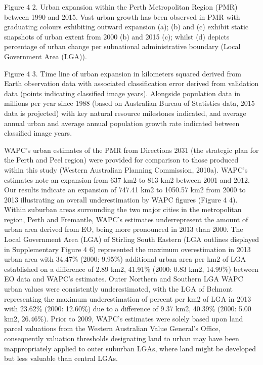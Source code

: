 \documentclass[]{book}
\begin{document}
Figure 4 2. Urban expansion within the Perth Metropolitan Region (PMR)
between 1990 and 2015. Vast urban growth has been observed in PMR with
graduating colours exhibiting outward expansion (a); (b) and (c) exhibit
static snapshots of urban extent from 2000 (b) and 2015 (c); whilst (d)
depicts percentage of urban change per subnational administrative
boundary (Local Government Area (LGA)).

Figure 4 3. Time line of urban expansion in kilometers squared derived
from Earth observation data with associated classification error derived
from validation data (points indicating classified image years).
Alongside population data in millions per year since 1988 (based on
Australian Bureau of Statistics data, 2015 data is projected) with key
natural resource milestones indicated, and average annual urban and
average annual population growth rate indicated between classified image
years.

WAPC's urban estimates of the PMR from Directions 2031 (the strategic
plan for the Perth and Peel region) were provided for comparison to
those produced within this study (Western Australian Planning
Commission, 2010a). WAPC's estimates note an expansion from 637 km2 to
813 km2 between 2001 and 2012. Our results indicate an expansion of
747.41 km2 to 1050.57 km2 from 2000 to 2013 illustrating an overall
underestimation by WAPC figures (Figure 4 4). Within suburban areas
surrounding the two major cities in the metropolitan region, Perth and
Fremantle, WAPC's estimates underrepresent the amount of urban area
derived from EO, being more pronounced in 2013 than 2000. The Local
Government Area (LGA) of Stirling South Eastern (LGA outlines displayed
in Supplementary Figure 4 6) represented the maximum overestimation in
2013 urban area with 34.47\% (2000: 9.95\%) additional urban area per
km2 of LGA established on a difference of 2.89 km2, 41.91\% (2000: 0.83
km2, 14.99\%) between EO data and WAPC's estimates. Outer Northern and
Southern LGA WAPC urban values were consistently underestimated, with
the LGA of Belmont representing the maximum underestimation of percent
per km2 of LGA in 2013 with 23.62\% (2000: 12.60\%) due to a difference
of 9.37 km2, 40.39\% (2000: 5.00 km2, 26.46\%). Prior to 2009, WAPC's
estimates were solely based upon land parcel valuations from the Western
Australian Value General's Office, consequently valuation thresholds
designating land to urban may have been inappropriately applied to outer
suburban LGAs, where land might be developed but less valuable than
central LGAs.
\end{document}
